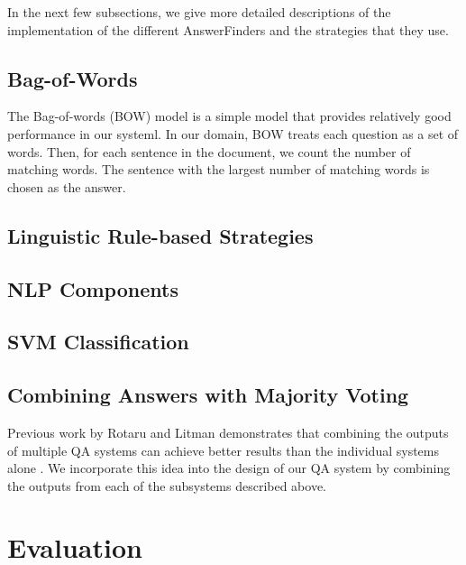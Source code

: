 \documentclass{acm_proc_article-sp}
\begin{document}
In the next few subsections, we give more detailed descriptions of
the implementation of the different AnswerFinders and the
strategies that they use.

\subsection{Bag-of-Words}

The Bag-of-words (BOW) model is a simple model that provides relatively good
performance in our systeml. In our domain, BOW treats each question as
a set of words. Then, for each sentence in the document, we count the
number of matching words. The sentence with the largest number of
matching words is chosen as the answer.

\subsection{Linguistic Rule-based Strategies}


\subsection{NLP Components}


\subsection{SVM Classification}


\subsection{Combining Answers with Majority Voting}
Previous work by Rotaru and Litman demonstrates that combining
the outputs of multiple QA systems can achieve better results than the
individual systems alone \cite{rotaru2005}. We incorporate this idea
into the design of our QA system by combining the outputs from each of
the subsystems described above.


\section{Evaluation}
\label{sec:evaluation}
\end{document}
